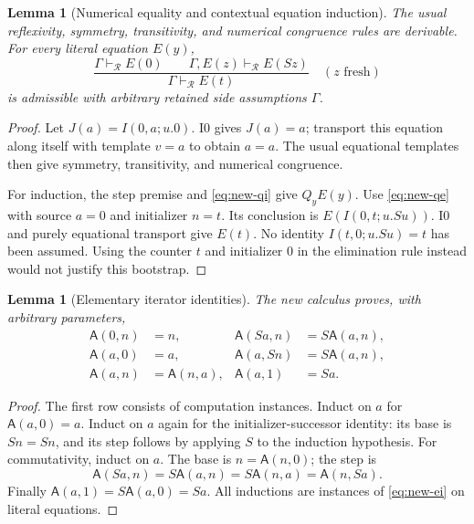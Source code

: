 \documentclass[11pt,a4paper]{article}
\newtheorem{lemma}[theorem]{Lemma}
\theoremstyle{definition}
\begin{document}
\begin{lemma}[Numerical equality and contextual equation induction]
\label{lem:new-ei}
The usual reflexivity, symmetry, transitivity, and numerical congruence rules
are derivable.  For every literal equation $E(y)$,
\begin{equation}
 \frac{\Gamma\vdash_{\mathcal R}E(0)\qquad
       \Gamma,E(z)\vdash_{\mathcal R}E(Sz)}
      {\Gamma\vdash_{\mathcal R}E(t)}
 \quad(z\text{ fresh})
 \label{eq:new-ei}
\end{equation}
is admissible with arbitrary retained side assumptions $\Gamma$.
\end{lemma}
\begin{proof}
Let $J(a)=I(0,a;u.0)$.  I0 gives $J(a)=a$; transport this equation along
itself with template $v=a$ to obtain $a=a$.  The usual equational templates
then give symmetry, transitivity, and numerical congruence.

For induction, the step premise and \eqref{eq:new-qi} give $Q_yE(y)$.
Use \eqref{eq:new-qe} with source $a=0$ and initializer $n=t$.  Its conclusion
is $E(I(0,t;u.Su))$.  I0 and purely equational transport give $E(t)$.
No identity $I(t,0;u.Su)=t$ has been assumed.  Using the counter $t$ and
initializer $0$ in the elimination rule instead would not justify this
bootstrap.
\end{proof}

\begin{lemma}[Elementary iterator identities]
\label{lem:new-addition}
The new calculus proves, with arbitrary parameters,
\begin{equation}
 \begin{aligned}
 \mathsf A(0,n)&=n,&
 \mathsf A(Sa,n)&=S\mathsf A(a,n),\\
 \mathsf A(a,0)&=a,&
 \mathsf A(a,Sn)&=S\mathsf A(a,n),\\
 \mathsf A(a,n)&=\mathsf A(n,a),&
 \mathsf A(a,1)&=Sa.
 \end{aligned}
 \label{eq:new-add-identities}
\end{equation}
\end{lemma}
\begin{proof}
The first row consists of computation instances.  Induct on $a$ for
$\mathsf A(a,0)=a$.  Induct on $a$ again for the initializer-successor
identity: its base is $Sn=Sn$, and its step follows by applying $S$ to the
induction hypothesis.  For commutativity, induct on $a$.  The base is
$n=\mathsf A(n,0)$; the step is
\[
 \mathsf A(Sa,n)=S\mathsf A(a,n)
               =S\mathsf A(n,a)=\mathsf A(n,Sa).
\]
Finally $\mathsf A(a,1)=S\mathsf A(a,0)=Sa$.
All inductions are instances of \eqref{eq:new-ei} on literal equations.
\end{proof}
\end{document}
